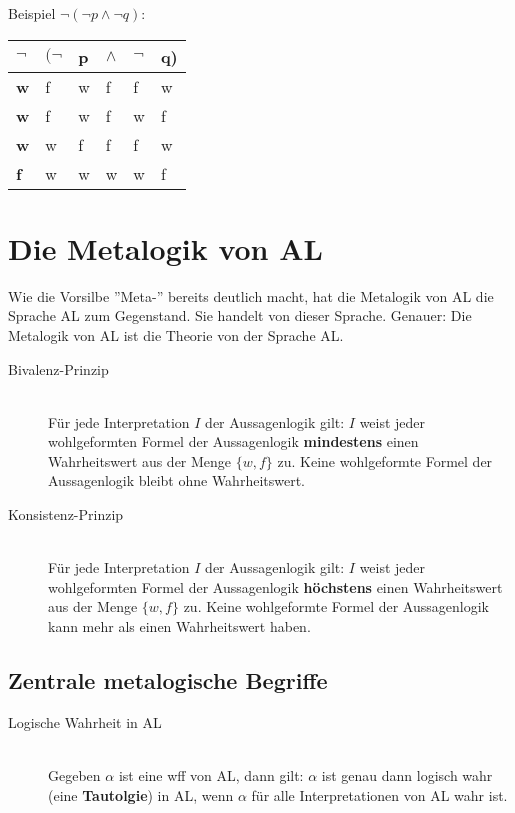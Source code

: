 \documentclass{scrartcl}
\begin{document}
Beispiel $ \neg (\neg p \wedge \neg q) $: \\

\begin{tabular}{|l l l l l l|}
	\hline
	$ \neg $ & $ (\neg $ & p & $ \wedge $ & $ \neg $ & q) \\
	\hline
	\textbf{w} & f & w & f & f & w \\
	\hline
	\textbf{w} & f & w & f & w & f \\
	\hline
	\textbf{w} & w & f & f & f & w \\
	\hline
	\textbf{f} & w & w & w & w & f \\
	\hline
\end{tabular}

\section{Die Metalogik von AL}

Wie die Vorsilbe ''Meta-'' bereits deutlich macht, hat die Metalogik von AL die Sprache AL zum Gegenstand. Sie handelt von dieser Sprache. Genauer: Die Metalogik von AL ist die Theorie von der Sprache AL.

\begin{description}
	\item[Bivalenz-Prinzip] \mbox{}\\ Für jede Interpretation $ I $ der Aussagenlogik gilt: $ I $ weist jeder wohlgeformten Formel der Aussagenlogik \textbf{mindestens} einen Wahrheitswert aus der Menge $ \{ w,f \} $ zu. Keine wohlgeformte Formel der Aussagenlogik bleibt ohne Wahrheitswert.
\end{description}

\begin{description}
	\item[Konsistenz-Prinzip] \mbox{}\\ Für jede Interpretation $ I $ der Aussagenlogik gilt: $ I $ weist jeder wohlgeformten Formel der Aussagenlogik \textbf{höchstens} einen Wahrheitswert aus der Menge $ \{ w,f \} $ zu. Keine wohlgeformte Formel der Aussagenlogik kann mehr als einen Wahrheitswert haben.
\end{description}

\subsection{Zentrale metalogische Begriffe}

\begin{description}
	\item[Logische Wahrheit in AL] \mbox{}\\ Gegeben $ \alpha $ ist eine wff von AL, dann gilt: $ \alpha $ ist genau dann logisch wahr (eine \textbf{Tautolgie}) in AL, wenn $ \alpha $ für alle Interpretationen von AL wahr ist.
\end{description}
\end{document}

